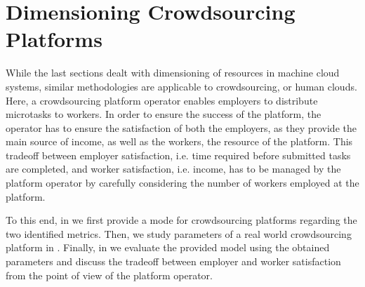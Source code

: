 \section{Dimensioning Crowdsourcing Platforms}\label{sec:cloud:crowdsourcing}
\newcommand{\campaignIAT}{\ensuremath{A_C}\xspace}
\newcommand{\campaignSize}{\ensuremath{\Theta}\xspace}
\newcommand{\taskDuration}{\ensuremath{B}\xspace}
\newcommand{\meanTaskLength}{\ensuremath{E[B]}\xspace}
\newcommand{\numberOfWorkers}{\ensuremath{c}\xspace}
\newcommand{\workerUtilization}{\ensuremath{\rho}\xspace}
\newcommand{\campaignDuration}{\ensuremath{\delta}\xspace}
\newcommand{\preTaskProcessingDelay}{\ensuremath{E[D]}\xspace}
While the last sections dealt with dimensioning of resources in machine cloud systems, similar methodologies are applicable to crowdsourcing, or human clouds.
Here, a crowdsourcing platform operator enables employers to distribute microtasks to workers.
In order to ensure the success of the platform, the operator has to ensure the satisfaction of both the employers, as they provide the main source of income, as well as the workers, the resource of the platform.
This tradeoff between employer satisfaction, i.e. time required before submitted tasks are completed, and worker satisfaction, i.e. income, has to be managed by the platform operator by carefully considering the number of workers employed at the platform.

To this end, in  we first provide a mode for crowdsourcing platforms regarding the two identified metrics.
Then, we study parameters of a real world crowdsourcing platform in .
Finally, in  we evaluate the provided model using the obtained parameters and discuss the tradeoff between employer and worker satisfaction from the point of view of the platform operator.



